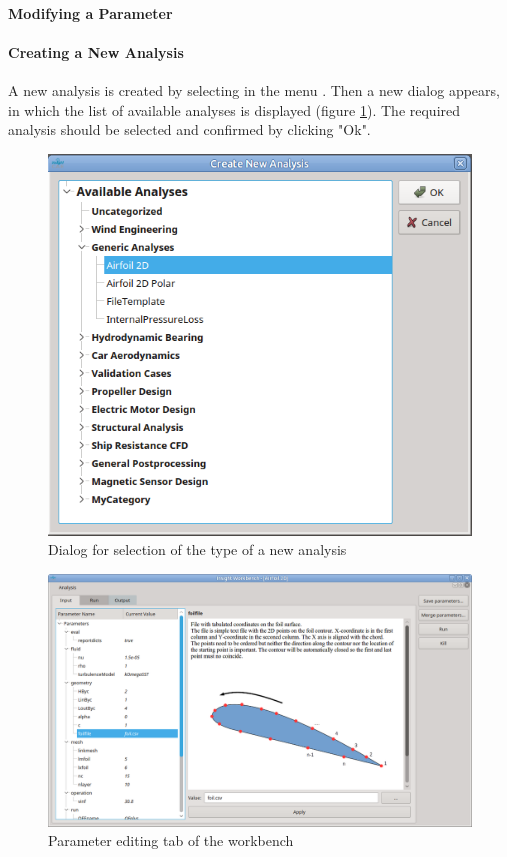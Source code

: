 \paragraph{Modifying a Parameter}\label{par:workbench:change_parameter}

\paragraph{Creating a New Analysis}\label{par:workbench:new_analysis}
A new analysis is created by selecting in the menu . Then a new dialog appears, in which the list of available analyses is displayed (figure \ref{fig:workbench_new_analysis}).
The required analysis should be selected and confirmed by clicking "Ok".

\begin{figure}[tb]
\centering
\includegraphics[width=0.5\linewidth]{figs/workbench/workbench_new_analysis}
\caption{Dialog for selection of the type of a new analysis}
\label{fig:workbench_new_analysis}
\end{figure}



\begin{figure}[tb]
\centering
\includegraphics[width=\linewidth]{figs/workbench/workbench_airfoil_parameters}
\caption{Parameter editing tab of the workbench}
\label{fig:workbench_parameters}
\end{figure}

